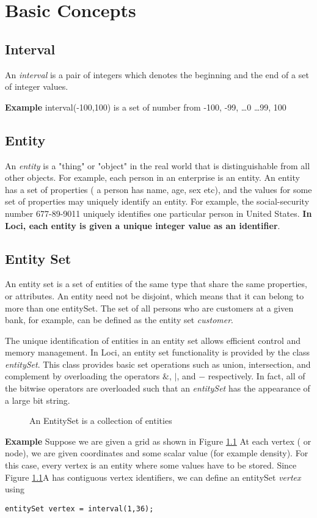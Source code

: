 \chapter{ Basic Concepts }

\section {Interval}
An {\em interval } is a pair of integers which denotes the beginning and the
end of a set of integer values.
\par {\bf Example } interval(-100,100) is a set of number from -100, -99, \dots 0 \dots 99, 100


%
\section{Entity}
\par  An {\em entity} is a "thing" or "object" in the real world that
is distinguishable from all other objects. For example, each person in 
an enterprise is an entity. An entity has a set of properties ( a person
has name, age, sex etc), and the
values for some set of properties may uniquely identify an entity. For
example, the social-security number 677-89-9011 uniquely identifies
one particular person in United States. {\bf In Loci, each entity is given
a unique integer value as an identifier}.
%
\section{Entity Set} 
\par An {entity set } is a set of entities of the same type that share 
the same properties, or attributes. An entity need not be disjoint, which means that 
it can belong to more than one entitySet.  The set of all persons who are
customers at a given bank, for example, can be defined as the entity
set {\em customer}.
%
\par The unique identification of entities in an entity set allows
efficient control and memory management. In Loci, an entity set functionality is provided by 
the class {\em entitySet}.  This class provides basic set operations such as union, 
intersection, and complement by overloading the operators ${\&}$, ${|}$, and ${-}$
respectively.  In fact, all of the bitwise operators are overloaded
such that an {\em entitySet} has the appearance of a large bit string.
%
\begin{figure}[ht]
\vspace{3.5in}\caption { An EntitySet is a collection of entities}
\label {FigEntitySet}
\end{figure}
%
\par{\bf Example} Suppose we are given a grid as shown in Figure \ref{FigEntitySet}
At each vertex ( or node), we are given coordinates and some scalar value
(for example density). For this case, every vertex is an entity where
some values have to be stored. 
%
Since Figure \ref{FigEntitySet}A has contiguous vertex identifiers, we can define an
entitySet {\em vertex} using 
\begin{verbatim}
entitySet vertex = interval(1,36);
\end{verbatim}

